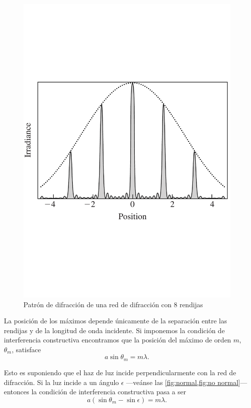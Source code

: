 \documentclass[12pt]{article}
\numberwithin{table}{section}
\numberwithin{figure}{section}
\numberwithin{equation}{section}
\begin{document}
\begin{figure}[htb]
	\centering
	\includegraphics[scale = 0.3]{red.pdf}
	\caption{Patrón de difracción de una red de difracción con 8 rendijas}
	\label{fig:patron}
\end{figure}

La posición de los máximos depende únicamente de la separación entre las rendijas y de la longitud de onda incidente. Si imponemos la condición de interferencia constructiva encontramos que la posición del máximo de orden \( m \), \( \theta_m \), satisface
\begin{equation} \label{eqn:interferencia}
	a\sin{\theta_m} = m\lambda.
\end{equation}

Esto es suponiendo que el haz de luz incide perpendicularmente con la red de difracción. Si la luz incide a un ángulo \( \epsilon \) ---veánse las \cref{fig:normal,fig:no normal}--- entonces la condición de interferencia constructiva pasa a ser
\begin{equation} \label{eqn:interferencia1}
	a(\sin{\theta_m} - \sin{\epsilon}) = m\lambda.
\end{equation}
\end{document}
